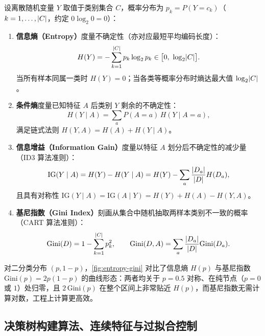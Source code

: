 \begin{definition}\label{def:entropy-ig-gini}
设离散随机变量 $Y$ 取值于类别集合 $C$，概率分布为 $p_k = P(Y = c_k)$（$k=1,\dots,\lvert C\rvert$，约定 $0\log_2 0 = 0$）：
\begin{enumerate}
  \item \textbf{信息熵（Entropy）}度量不确定性（亦对应最短平均编码长度）：
  \begin{equation}\label{eq:entropy}
    H(Y) = -\sum_{k=1}^{\abs{C}} p_k \log_2 p_k \in \bigl[0,\ \log_2\abs{C}\bigr].
  \end{equation}
  当所有样本同属一类时 $H(Y)=0$；当各类等概率分布时熵达最大值 $\log_2\lvert C\rvert$。
  \item \textbf{条件熵}度量已知特征 $A$ 后类别 $Y$ 剩余的不确定性：
  \[
    H(Y\mid A) = \sum_{a} P(A=a)\,H(Y\mid A=a),
  \]
  满足链式法则 $H(Y, A) = H(A) + H(Y\mid A)$。
  \item \textbf{信息增益（Information Gain）}度量以特征 $A$ 划分后不确定性的减少量（ID3 算法准则）：
  \begin{equation}\label{eq:info-gain}
    \mathrm{IG}(Y\mid A) = H(Y) - H(Y\mid A) = H(Y) - \sum_{a}\frac{\lvert D_a\rvert}{\lvert D\rvert} H(D_a),
  \end{equation}
  且具有对称性 $\mathrm{IG}(Y\mid A) = \mathrm{IG}(A\mid Y) = H(Y) + H(A) - H(Y, A)$。
  \item \textbf{基尼指数（Gini Index）}刻画从集合中随机抽取两样本类别不一致的概率（CART 算法准则）：
  \begin{equation}\label{eq:gini}
    \mathrm{Gini}(D) = 1 - \sum_{k=1}^{\lvert C\rvert} p_k^2,\qquad
    \mathrm{Gini}(D, A) = \sum_{a}\frac{\lvert D_a\rvert}{\lvert D\rvert}\mathrm{Gini}(D_a).
  \end{equation}
\end{enumerate}
\end{definition}

对二分类分布 $(p, 1-p)$，\cref{fig:entropy-gini} 对比了信息熵 $H(p)$ 与基尼指数 $\mathrm{Gini}(p) = 2p(1-p)$ 的曲线形态：两者均关于 $p=0.5$ 对称、在纯节点（$p=0$ 或 $1$）处归零，且 $2\,\mathrm{Gini}(p)$ 在整个区间上非常贴近 $H(p)$，而基尼指数无需计算对数，工程上计算更高效。


\subsection{决策树构建算法、连续特征与过拟合控制}

